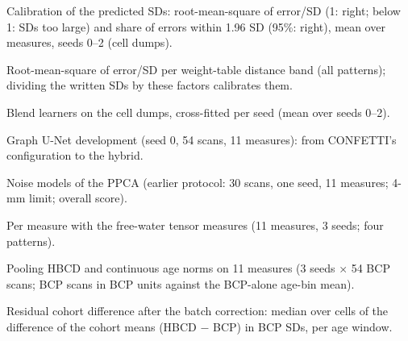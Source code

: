 \documentclass[11pt]{article}
\begin{document}
\begin{table}[h]
\centering\footnotesize
\caption{Calibration of the predicted SDs: root-mean-square of error/SD (1: right; below 1: SDs too large) and share of
errors within 1.96 SD (95\%: right), mean over measures, seeds 0--2 (cell dumps).}\label{tab:calib}

\end{table}

\begin{table}[h]
\centering\footnotesize
\caption{Root-mean-square of error/SD per weight-table distance band (all patterns); dividing the written SDs by
these factors calibrates them.}\label{tab:calibband}
\resizebox{\textwidth}{!}{}
\end{table}

\begin{table}[h]
\centering\footnotesize
\caption{Blend learners on the cell dumps, cross-fitted per seed (mean over seeds 0--2).}\label{tab:learners}
\resizebox{\textwidth}{!}{}
\end{table}

\begin{table}[h]
\centering\footnotesize
\caption{Graph U-Net development (seed 0, 54 scans, 11 measures): from CONFETTI's configuration to the hybrid.}\label{tab:confetti}

\end{table}

\begin{table}[h]
\centering\footnotesize
\caption{Noise models of the PPCA (earlier protocol: 30 scans, one seed, 11 measures; 4-mm limit; overall
score).}\label{tab:noise}

\end{table}

\begin{table}[h]
\centering\footnotesize
\caption{Per measure with the free-water tensor measures (11 measures, 3 seeds; four patterns).}\label{tab:fw}
\resizebox{\textwidth}{!}{}
\end{table}

\begin{table}[h]
\centering\footnotesize
\caption{Pooling HBCD and continuous age norms on 11 measures (3 seeds $\times$ 54 BCP scans; BCP scans in BCP units
against the BCP-alone age-bin mean).}\label{tab:pooling11}

\end{table}

\begin{table}[h]
\centering\footnotesize
\caption{Residual cohort difference after the batch correction: median over cells of the difference of the cohort means
(HBCD $-$ BCP) in BCP SDs, per age window.}\label{tab:batch}
\resizebox{\textwidth}{!}{}
\end{table}
\end{document}
